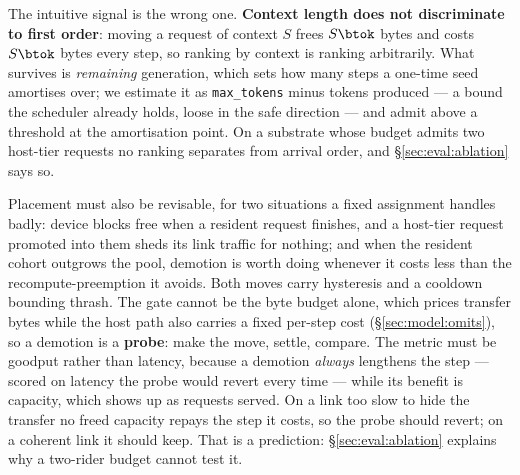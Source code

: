 The intuitive signal is the wrong one. \textbf{Context length does not discriminate
to first order}: moving a request of context $S$ frees $S\btok$ bytes and costs
$S\btok$ bytes every step, so ranking by context is ranking arbitrarily. What
survives is \emph{remaining} generation, which sets how many steps a one-time seed
amortises over; we estimate it as \texttt{max\_tokens} minus tokens produced --- a
bound the scheduler already holds, loose in the safe direction --- and admit above a
threshold at the amortisation point. On a substrate whose budget admits two host-tier
requests no ranking separates from arrival order, and \S\ref{sec:eval:ablation} says
so.

\label{sec:design:migration}
Placement must also be revisable, for two situations a fixed assignment handles
badly: device blocks free when a resident request finishes, and a host-tier request
promoted into them sheds its link traffic for nothing; and when the resident cohort
outgrows the pool, demotion is worth doing whenever it costs less than the
recompute-preemption it avoids. Both moves carry hysteresis and a cooldown bounding
thrash. The gate cannot be the byte budget alone, which prices transfer bytes while
the host path also carries a fixed per-step cost (\S\ref{sec:model:omits}), so a
demotion is a \textbf{probe}: make the move, settle, compare. The metric must be
goodput rather than latency, because a demotion \emph{always} lengthens the step ---
scored on latency the probe would revert every time --- while its benefit is
capacity, which shows up as requests served. On a link too slow to hide the transfer
no freed capacity repays the step it costs, so the probe should revert; on a
coherent link it should keep. That is a prediction:
\S\ref{sec:eval:ablation} explains why a two-rider budget cannot test it.
